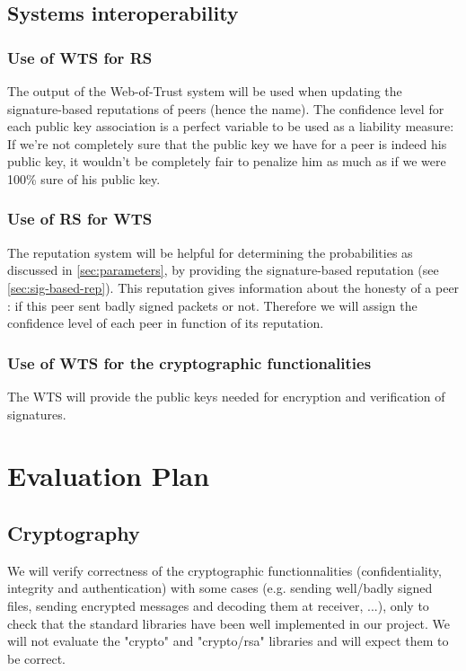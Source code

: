 \documentclass[]{article}
\begin{document}
\subsection{Systems interoperability}

\subsubsection{Use of WTS for RS}
The output of the Web-of-Trust system will be used when updating the signature-based reputations of peers (hence the name).
The confidence level for each public key association is a perfect variable to be used as a liability measure:
If we're not completely sure that the public key we have for a peer is indeed his public key, it wouldn't be completely fair to penalize him as much as if we were 100\% sure of his public key.

\subsubsection{Use of RS for WTS}
\label{sec:design-arch-interop-rs-wts}
The reputation system will be helpful for determining the probabilities as discussed in \ref{sec:parameters}, by providing the signature-based reputation (see \ref{sec:sig-based-rep}). This reputation gives information about the honesty of a peer : if this peer sent badly signed packets or not. Therefore we will assign the confidence level of each peer in function of its reputation.

\subsubsection{Use of WTS for the cryptographic functionalities}
The WTS will provide the public keys needed for encryption and verification of signatures.

\section{Evaluation Plan}

\subsection{Cryptography}
\label{sec:crypt-test}
We will verify correctness of the cryptographic functionnalities (confidentiality, integrity and authentication) with some cases (e.g. sending well/badly signed files, sending encrypted messages and decoding them at receiver, ...), only to check that the standard libraries have been well implemented in our project. We will not evaluate the "crypto" and "crypto/rsa" libraries and will expect them to be correct.
\end{document}
